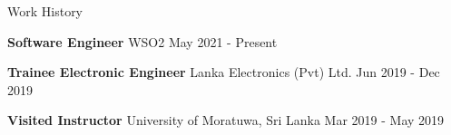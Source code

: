 \documentclass{resume} %
\begin{document}




 


\begin{rSection}{Work History}
\vspace{-1.25em}
\item \textbf{Software Engineer} {WSO2} \hfill May 2021 - Present
\item \textbf{Trainee Electronic Engineer} {Lanka Electronics (Pvt) Ltd.} \hfill Jun 2019 - Dec 2019
\item \textbf{Visited Instructor} {University of Moratuwa, Sri Lanka} \hfill Mar 2019 - May 2019
\end{rSection} 
\end{document}

